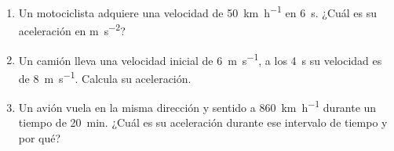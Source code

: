 \documentclass[14pt]{extarticle}
\begin{document}
\begin{enumerate}
Encuentra la velocidad en los siguientes intervalos de tiempo:
\begin{enumerate}[label=\alph*)]
\item \num{0} a \SI{2}{\second}
\item \num{0} a \SI{4}{\second}
\item \num{2} a \SI{4}{\second}
\item \num{4} a \SI{7}{\second}
\item \num{0} a \SI{8}{\second}
\end{enumerate}
\item Un motociclista adquiere una velocidad de \SI{50}{\kilo\meter\per\hour} en \SI{6}{\second}. ¿Cuál es su aceleración en \unit{\meter\per\square\second}?
\item Un camión lleva una velocidad inicial de \SI{6}{\meter\per\second}, a los \SI{4}{\second} su velocidad es de \SI{8}{\meter\per\second}. Calcula su aceleración.
\item  Un avión vuela en la misma dirección y sentido a \SI{860}{\kilo\meter\per\hour} durante un tiempo de \SI{20}{\minute}. ¿Cuál es su aceleración durante ese intervalo de tiempo y por qué?
\end{enumerate}
\end{document}
